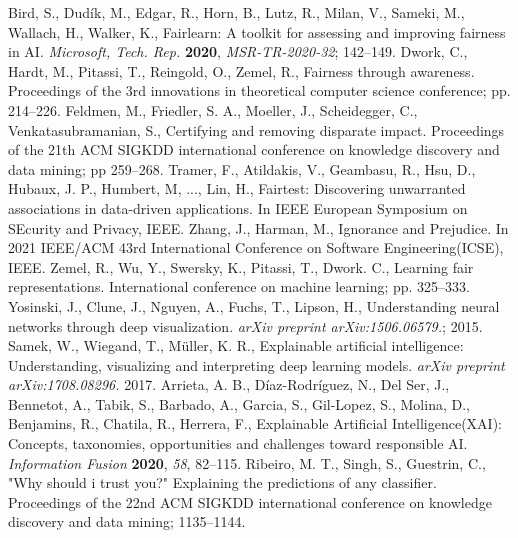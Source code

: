 \documentclass[symmetry,article,submit,moreauthors,pdftex]{Definitions/mdpi}
\begin{document}
\begin{thebibliography}{999}
Bird, S., Dudík, M., Edgar, R., Horn, B., Lutz, R., Milan, V., Sameki, M., Wallach, H., Walker, K., Fairlearn: A toolkit for assessing and improving fairness in AI. {\em Microsoft, Tech. Rep.} {\bf 2020}, {\em MSR-TR-2020-32}; 142--149.
Dwork, C., Hardt, M., Pitassi, T., Reingold, O., Zemel, R., Fairness through awareness. Proceedings of the 3rd innovations in theoretical computer science conference; pp. 214--226.
Feldmen, M., Friedler, S. A., Moeller, J., Scheidegger, C., Venkatasubramanian, S., Certifying and removing disparate impact. Proceedings of the 21th ACM SIGKDD international conference on knowledge discovery and data mining; pp 259--268.
Tramer, F., Atildakis, V., Geambasu, R., Hsu, D., Hubaux, J. P., Humbert, M, ..., Lin, H., Fairtest: Discovering unwarranted associations in data-driven applications. In IEEE European Symposium on SEcurity and Privacy, IEEE.
Zhang, J., Harman, M., Ignorance and Prejudice. In 2021 IEEE/ACM 43rd International Conference on Software Engineering(ICSE), IEEE.
Zemel, R., Wu, Y., Swersky, K., Pitassi, T., Dwork. C., Learning fair representations. International conference on machine learning; pp. 325--333.
Yosinski, J., Clune, J., Nguyen, A., Fuchs, T., Lipson, H., Understanding neural networks through deep visualization. \textit{arXiv preprint arXiv:1506.06579.}; 2015.
Samek, W., Wiegand, T., Müller, K. R., Explainable artificial intelligence: Understanding, visualizing and interpreting deep learning models. \textit{arXiv preprint arXiv:1708.08296.} 2017.
Arrieta, A. B., Díaz-Rodríguez, N., Del Ser, J., Bennetot, A., Tabik, S., Barbado, A., Garcia, S., Gil-Lopez, S., Molina, D., Benjamins, R., Chatila, R., Herrera, F., Explainable Artificial Intelligence(XAI): Concepts, taxonomies, opportunities and challenges toward responsible AI. {\em Information Fusion} {\bf 2020}, {\em 58}, 82--115.
Ribeiro, M. T., Singh, S., Guestrin, C., "Why should i trust you?" Explaining the predictions of any classifier. Proceedings of the 22nd ACM SIGKDD international conference on knowledge discovery and data mining; 1135--1144.

\end{thebibliography}
\end{document}
